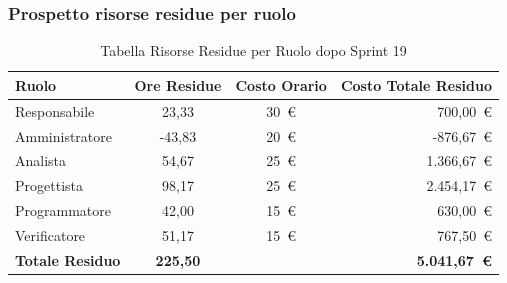 \subsubsection{Prospetto risorse residue per ruolo}
\begin{table}[H]
    \centering
    \renewcommand{\arraystretch}{1.3}
    \begin{tabularx}{\textwidth}{|X|c|c|r|}
        \hline
        \textbf{Ruolo} & \textbf{Ore Residue} & \textbf{Costo Orario} &
        \textbf{Costo Totale Residuo} \\
        \hline
        Responsabile   & 23,33 & 30~\euro & 700{,}00~\euro \\
        Amministratore & -43,83 & 20~\euro & -876{,}67~\euro \\
        Analista       & 54,67 & 25~\euro & 1.366{,}67~\euro \\
        Progettista    & 98,17 & 25~\euro & 2.454{,}17~\euro \\
        Programmatore  & 42,00 & 15~\euro & 630{,}00~\euro \\
        Verificatore   & 51,17 & 15~\euro & 767{,}50~\euro \\
        \hline
        \textbf{Totale Residuo} & \textbf{225,50} & &
        \textbf{5.041{,}67~\euro} \\
        \hline
    \end{tabularx}
    \caption{Tabella Risorse Residue per Ruolo dopo Sprint 19}
\end{table}

